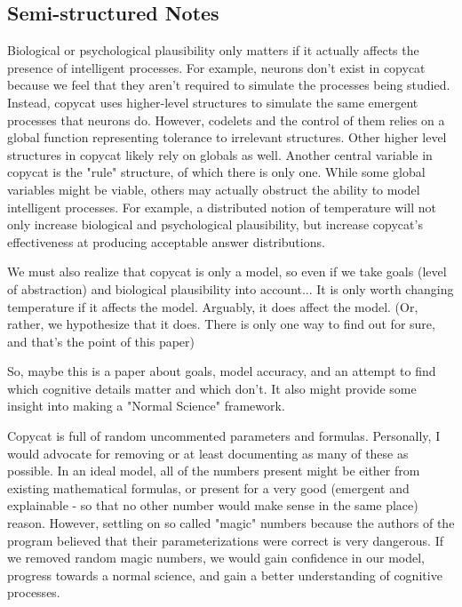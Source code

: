 \documentclass[a4paper]{article}
\begin{document}
\subsection{Semi-structured Notes}

Biological or psychological plausibility only matters if it actually affects the presence of intelligent processes. For example, neurons don't exist in copycat because we feel that they aren't required to simulate the processes being studied. Instead, copycat uses higher-level structures to simulate the same emergent processes that neurons do. However, codelets and the control of them relies on a global function representing tolerance to irrelevant structures. Other higher level structures in copycat likely rely on globals as well. Another central variable in copycat is the "rule" structure, of which there is only one. While some global variables might be viable, others may actually obstruct the ability to model intelligent processes. For example, a distributed notion of temperature will not only increase biological and psychological plausibility, but increase copycat's effectiveness at producing acceptable answer distributions.

We must also realize that copycat is only a model, so even if we take goals (level of abstraction) and biological plausibility into account...
It is only worth changing temperature if it affects the model.
Arguably, it does affect the model. (Or, rather, we hypothesize that it does. There is only one way to find out for sure, and that's the point of this paper)

So, maybe this is a paper about goals, model accuracy, and an attempt to find which cognitive details matter and which don't. It also might provide some insight into making a "Normal Science" framework.

Copycat is full of random uncommented parameters and formulas. Personally, I would advocate for removing or at least documenting as many of these as possible. In an ideal model, all of the numbers present might be either from existing mathematical formulas, or present for a very good (emergent and explainable - so that no other number would make sense in the same place) reason. However, settling on so called "magic" numbers because the authors of the program believed that their parameterizations were correct is very dangerous. If we removed random magic numbers, we would gain confidence in our model, progress towards a normal science, and gain a better understanding of cognitive processes. 
\end{document}
